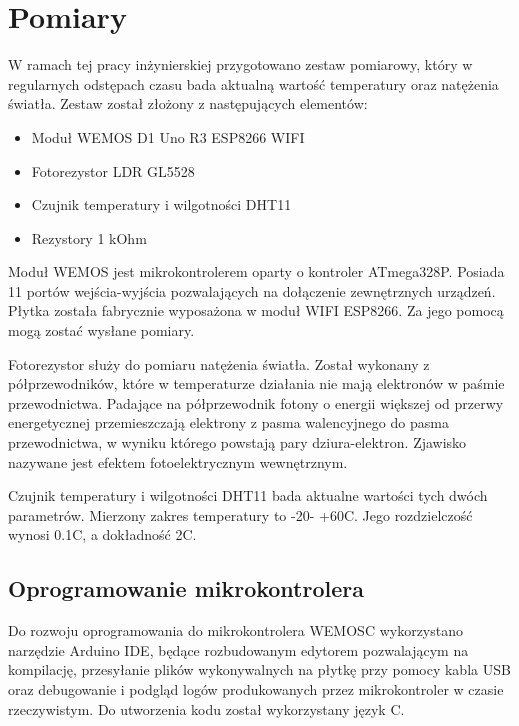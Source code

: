 \newpage
\section{Pomiary}

W ramach tej pracy inżynierskiej przygotowano zestaw pomiarowy, który 
w regularnych odstępach czasu bada aktualną wartość temperatury oraz
natężenia światła. Zestaw został złożony z następujących elementów:

\begin{itemize} %
    \item Moduł WEMOS D1 Uno R3 ESP8266 WIFI
    \item Fotorezystor LDR GL5528
    \item Czujnik temperatury i wilgotności DHT11
    \item Rezystory 1 kOhm
\end{itemize}

Moduł WEMOS jest mikrokontrolerem oparty o kontroler ATmega328P. Posiada
11 portów wejścia-wyjścia pozwalających na dołączenie zewnętrznych 
urządzeń. Płytka została fabrycznie wyposażona w moduł WIFI ESP8266. Za
jego pomocą mogą zostać wysłane pomiary.

Fotorezystor służy do pomiaru natężenia światła. Został wykonany 
z półprzewodników, które w temperaturze działania nie mają elektronów 
w paśmie przewodnictwa. Padające na półprzewodnik fotony o energii 
większej od przerwy energetycznej przemieszczają elektrony z pasma 
walencyjnego do pasma przewodnictwa, w wyniku którego powstają pary 
dziura-elektron. Zjawisko nazywane jest efektem fotoelektrycznym 
wewnętrznym.

Czujnik temperatury i wilgotności DHT11 bada aktualne wartości tych
dwóch parametrów. Mierzony zakres temperatury to -20\degree  - +60\degree C.
Jego rozdzielczość wynosi 0.1\degree C, a dokładność 2\degree C.

\subsection{Oprogramowanie mikrokontrolera}

Do rozwoju oprogramowania do mikrokontrolera WEMOSC wykorzystano narzędzie 
Arduino IDE, będące rozbudowanym edytorem pozwalającym na kompilację,
przesyłanie plików wykonywalnych na płytkę przy pomocy kabla USB oraz
debugowanie i podgląd logów produkowanych przez mikrokontroler w czasie 
rzeczywistym. Do utworzenia kodu został wykorzystany język C.

